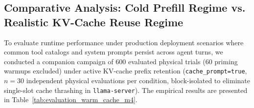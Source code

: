 \documentclass[preprint,12pt,3p]{elsarticle}
\begin{document}


\subsection{Comparative Analysis: Cold Prefill Regime vs. Realistic KV-Cache Reuse Regime}
To evaluate runtime performance under production deployment scenarios where common tool catalogs and system prompts persist across agent turns, we conducted a companion campaign of 600 evaluated physical trials (60 priming warmups excluded) under active KV-cache prefix retention (\texttt{cache\_prompt=true}, $n=30$ independent physical evaluations per condition, block-isolated to eliminate single-slot cache thrashing in \texttt{llama-server}). The empirical results are presented in Table~\ref{tab:evaluation_warm_cache_m4}.


\end{document}
